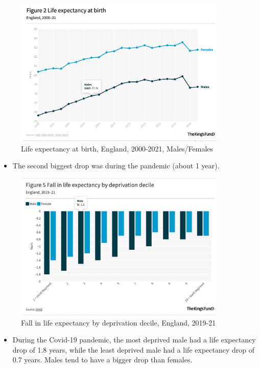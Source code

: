 \begin{figure}[H]%
                \centering
                \includegraphics[width=4in]{images/ch3/32.png}
                \caption{Life expectancy at birth, England, 2000-2021, Males/Females}
                \label{fig:label}
            \end{figure}        
\begin{itemize}
        \item The second biggest drop was during the pandemic (about 1 year).
\end{itemize}     

\begin{figure}[H]%
                \centering
                \includegraphics[width=4in]{images/ch3/33.png}
                \caption{Fall in life expectancy by deprivation decile, England, 2019-21}
                \label{fig:label}
            \end{figure}        
\begin{itemize}
        \item During the Covid-19 pandemic, the most deprived male had a life expectancy drop of 1.8 years, while the least deprived male had a life expectancy drop of 0.7 years. Males tend to have a bigger drop than females. 
\end{itemize}   

